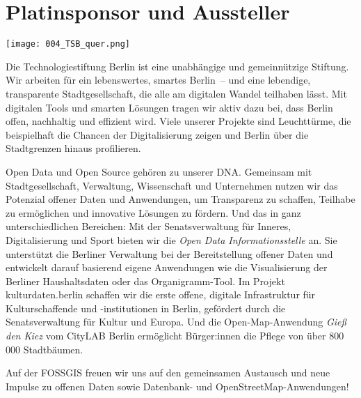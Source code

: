 \section*{Platinsponsor und Aussteller}

\vspace{-0.5cm}
\centerline{\texttt{[image: 004\_TSB\_quer.png]}}
Die Technologiestiftung Berlin ist eine unabhängige und gemeinnützige Stiftung. Wir arbeiten für ein lebenswertes, smartes Berlin~-- und eine lebendige, transparente Stadtgesellschaft, die alle am digitalen Wandel teilhaben lässt. Mit digitalen Tools und smarten Lösungen tragen wir aktiv dazu bei, dass Berlin offen, nachhaltig und effizient wird. Viele unserer Projekte sind Leuchttürme, die beispielhaft die Chancen der Digitalisierung zeigen und Berlin über die Stadtgrenzen hinaus profilieren.

Open Data und Open Source gehören zu unserer DNA. Gemeinsam mit Stadtgesellschaft, Verwaltung, Wissenschaft und Unternehmen nutzen wir das Potenzial offener Daten und Anwendungen, um Transparenz zu schaffen, Teilhabe zu ermöglichen und innovative Lösungen zu fördern. Und das in ganz unterschiedlichen Bereichen: Mit der Senatsverwaltung für Inneres, Digitalisierung und Sport bieten wir die \emph{Open Data Informationsstelle} an. Sie unterstützt die Berliner Verwaltung bei der Bereitstellung offener Daten und entwickelt darauf basierend eigene Anwendungen wie die Visualisierung der Berliner Haushaltsdaten oder das Organigramm-Tool. Im Projekt kulturdaten.berlin schaffen wir die erste offene, digitale Infrastruktur für Kulturschaffende und -institutionen in Berlin, gefördert durch die Senatsverwaltung für Kultur und Europa. Und die Open-Map-Anwendung \emph{Gieß den Kiez} vom CityLAB Berlin ermöglicht Bürger:innen die Pflege von über 800\,000 Stadtbäumen.

Auf der FOSSGIS freuen wir uns auf den gemeinsamen Austausch und neue Impulse zu offenen Daten sowie Datenbank- und OpenStreetMap-Anwendungen!
\normalsize
